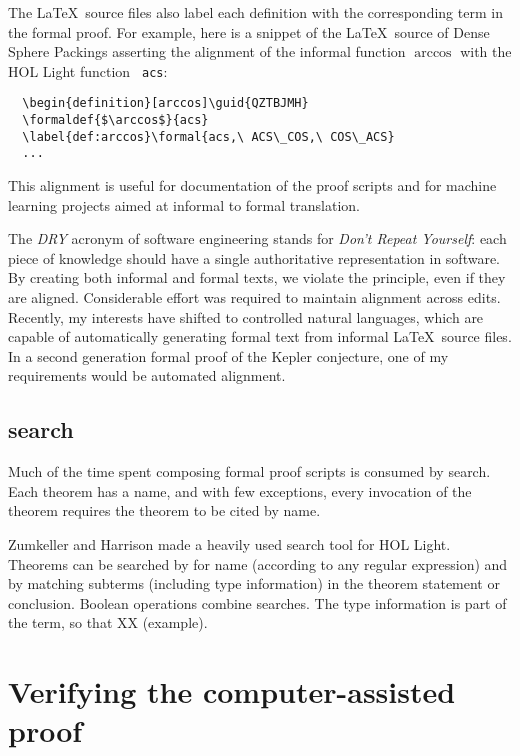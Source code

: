 \documentclass{amsart}
\begin{document}
The \LaTeX\ source files also label each definition with the
corresponding term in the formal proof. For example, here is a snippet
of the \LaTeX\ source of Dense Sphere Packings asserting the alignment
of the informal function $\arccos$ with the HOL Light function {\tt
  acs}:

\begin{verbatim}
  \begin{definition}[arccos]\guid{QZTBJMH}
  \formaldef{$\arccos$}{acs}
  \label{def:arccos}\formal{acs,\ ACS\_COS,\ COS\_ACS}
  ...
\end{verbatim}

This alignment is useful for documentation of the proof scripts and
for machine learning projects aimed at informal to formal translation.

The \emph{DRY} acronym of software engineering stands for \emph{Don't
  Repeat Yourself}: each piece of knowledge should have a single
authoritative representation in software.  By creating both informal
and formal texts, we violate the principle, even if they are aligned.
Considerable effort was required to maintain alignment across edits.
Recently, my interests have shifted to controlled natural languages,
which are capable of automatically generating formal text from
informal \LaTeX\ source files.  In a second generation formal proof of
the Kepler conjecture, one of my requirements would be automated
alignment.

\subsection{search}

Much of the time spent composing formal proof scripts is consumed
by search.  Each theorem has a name, and with few exceptions,
every invocation of the theorem requires the theorem to be cited
by name.  

Zumkeller and Harrison made a heavily used search tool for HOL Light.
Theorems can be searched by for name (according to any regular
expression) and by matching subterms (including type information) in
the theorem statement or conclusion.  Boolean operations combine
searches.  The type information is part of the term, so that XX
(example).




\section{Verifying the computer-assisted proof}
\end{document}
